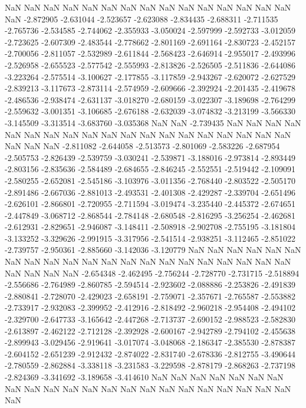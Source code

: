 NaN
NaN
NaN
NaN
NaN
NaN
NaN
NaN
NaN
NaN
NaN
NaN
NaN
NaN
NaN
NaN
-2.872905
-2.631044
-2.523657
-2.623088
-2.834435
-2.688311
-2.711535
-2.765736
-2.534585
-2.744062
-2.355933
-3.050024
-2.597999
-2.592733
-3.012059
-2.723625
-2.607309
-2.483544
-2.778662
-2.801169
-2.691164
-2.830723
-2.452157
-2.700056
-2.811057
-2.532989
-2.611844
-2.568423
-2.646914
-2.955017
-2.493996
-2.526958
-2.655523
-2.577542
-2.555993
-2.813826
-2.526505
-2.511836
-2.644086
-3.223264
-2.575514
-3.100627
-2.177855
-3.117859
-2.943267
-2.620072
-2.627529
-2.839213
-3.117673
-2.873114
-2.574959
-2.609666
-2.392924
-2.201435
-2.419678
-2.486536
-2.938474
-2.631137
-3.018270
-2.680159
-3.022307
-3.189698
-2.764299
-2.559632
-3.001351
-3.106685
-2.676188
-2.632039
-3.074832
-3.213199
-3.566330
-3.145509
-3.313514
-3.683760
-3.035368
NaN
NaN
-2.739435
NaN
NaN
NaN
NaN
NaN
NaN
NaN
NaN
NaN
NaN
NaN
NaN
NaN
NaN
NaN
NaN
NaN
NaN
NaN
NaN
NaN
NaN
-2.811082
-2.644058
-2.513573
-2.801069
-2.583226
-2.687954
-2.505753
-2.826439
-2.539759
-3.030241
-2.539871
-3.188016
-2.973814
-2.893449
-2.803156
-2.835636
-2.584489
-2.684655
-2.846245
-2.552551
-2.519442
-2.109091
-2.580255
-2.652081
-2.545186
-3.103976
-3.011356
-2.768440
-2.803522
-2.505170
-2.891486
-2.667036
-2.881013
-2.493531
-2.401308
-2.429287
-2.339704
-2.651496
-2.626101
-2.866801
-2.720955
-2.711594
-3.019474
-3.235440
-2.445372
-2.674651
-2.447849
-3.068712
-2.868544
-2.784148
-2.680548
-2.816295
-3.256254
-2.462681
-2.612931
-2.829651
-2.946087
-3.148411
-2.508918
-2.902708
-2.755195
-3.181804
-3.133252
-3.329626
-2.991915
-3.317956
-2.541514
-2.938251
-3.112465
-2.851022
-2.739757
-2.950361
-2.885660
-3.142036
-3.120779
NaN
NaN
NaN
NaN
NaN
NaN
NaN
NaN
NaN
NaN
NaN
NaN
NaN
NaN
NaN
NaN
NaN
NaN
NaN
NaN
NaN
NaN
NaN
NaN
NaN
-2.654348
-2.462495
-2.756244
-2.728770
-2.731715
-2.518894
-2.556686
-2.764989
-2.860785
-2.594514
-2.923602
-2.088886
-2.253826
-2.491839
-2.880841
-2.728070
-2.429023
-2.658191
-2.759071
-2.357671
-2.765587
-2.553882
-2.733917
-2.932083
-2.399952
-2.412916
-2.818492
-2.960218
-2.954408
-2.494102
-2.329700
-2.647733
-3.165642
-2.447268
-2.713737
-2.690152
-2.988523
-2.582830
-2.613897
-2.462122
-2.712128
-2.392928
-2.600167
-2.942789
-2.794102
-2.455638
-2.899943
-3.029456
-2.919641
-3.017074
-3.048068
-2.186347
-2.385530
-2.878387
-2.604152
-2.651239
-2.912432
-2.874022
-2.831740
-2.678336
-2.812755
-3.490644
-2.780559
-2.862884
-3.338118
-3.231583
-3.229598
-2.878179
-2.868263
-2.737198
-2.824369
-3.341692
-3.189658
-3.414610
NaN
NaN
NaN
NaN
NaN
NaN
NaN
NaN
NaN
NaN
NaN
NaN
NaN
NaN
NaN
NaN
NaN
NaN
NaN
NaN
NaN
NaN
NaN
